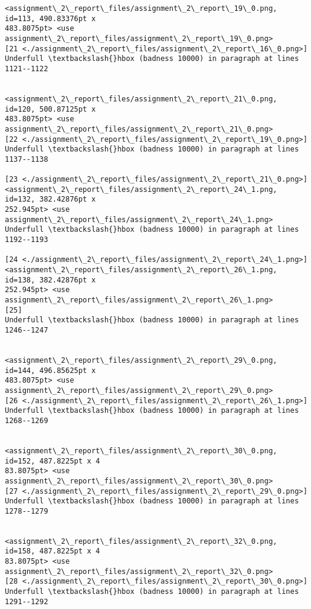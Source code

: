 \documentclass[11pt]{article}
\begin{document}
\begin{Verbatim}[commandchars=\\\{\}]
<assignment\_2\_report\_files/assignment\_2\_report\_19\_0.png, id=113, 490.83376pt x 
483.8075pt> <use assignment\_2\_report\_files/assignment\_2\_report\_19\_0.png>
[21 <./assignment\_2\_report\_files/assignment\_2\_report\_16\_0.png>]
Underfull \textbackslash{}hbox (badness 10000) in paragraph at lines 1121--1122


<assignment\_2\_report\_files/assignment\_2\_report\_21\_0.png, id=120, 500.87125pt x 
483.8075pt> <use assignment\_2\_report\_files/assignment\_2\_report\_21\_0.png>
[22 <./assignment\_2\_report\_files/assignment\_2\_report\_19\_0.png>]
Underfull \textbackslash{}hbox (badness 10000) in paragraph at lines 1137--1138

[23 <./assignment\_2\_report\_files/assignment\_2\_report\_21\_0.png>]
<assignment\_2\_report\_files/assignment\_2\_report\_24\_1.png, id=132, 382.42876pt x 
252.945pt> <use assignment\_2\_report\_files/assignment\_2\_report\_24\_1.png>
Underfull \textbackslash{}hbox (badness 10000) in paragraph at lines 1192--1193

[24 <./assignment\_2\_report\_files/assignment\_2\_report\_24\_1.png>]
<assignment\_2\_report\_files/assignment\_2\_report\_26\_1.png, id=138, 382.42876pt x 
252.945pt> <use assignment\_2\_report\_files/assignment\_2\_report\_26\_1.png>
[25]
Underfull \textbackslash{}hbox (badness 10000) in paragraph at lines 1246--1247


<assignment\_2\_report\_files/assignment\_2\_report\_29\_0.png, id=144, 496.85625pt x 
483.8075pt> <use assignment\_2\_report\_files/assignment\_2\_report\_29\_0.png>
[26 <./assignment\_2\_report\_files/assignment\_2\_report\_26\_1.png>]
Underfull \textbackslash{}hbox (badness 10000) in paragraph at lines 1268--1269


<assignment\_2\_report\_files/assignment\_2\_report\_30\_0.png, id=152, 487.8225pt x 4
83.8075pt> <use assignment\_2\_report\_files/assignment\_2\_report\_30\_0.png>
[27 <./assignment\_2\_report\_files/assignment\_2\_report\_29\_0.png>]
Underfull \textbackslash{}hbox (badness 10000) in paragraph at lines 1278--1279


<assignment\_2\_report\_files/assignment\_2\_report\_32\_0.png, id=158, 487.8225pt x 4
83.8075pt> <use assignment\_2\_report\_files/assignment\_2\_report\_32\_0.png>
[28 <./assignment\_2\_report\_files/assignment\_2\_report\_30\_0.png>]
Underfull \textbackslash{}hbox (badness 10000) in paragraph at lines 1291--1292


\end{Verbatim}
\end{document}

